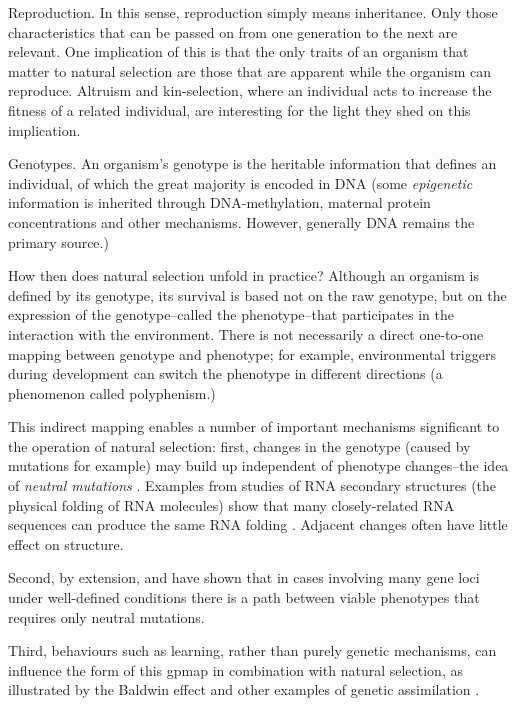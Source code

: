 Reproduction. In this sense, reproduction simply means inheritance. Only those characteristics that can be passed on from one generation to the next are relevant. One implication of this is that the only traits of an organism that matter to natural selection are those that are apparent while the organism can reproduce. Altruism and kin-selection, where an individual acts to increase the fitness of a related individual, are interesting for the light they shed on this implication.

Genotypes. An organism's \gls{genotype} is the heritable information that defines an individual, of which the great majority is encoded in DNA (some \emph{epigenetic} information is inherited through DNA-methylation, maternal protein concentrations and other mechanisms. However, generally DNA remains the primary source.)

How then does natural selection unfold in practice? Although an organism is defined by its genotype, its survival is based not on the raw genotype, but on the expression of the genotype--called the \gls{phenotype}--that participates in the interaction with the environment. There is not necessarily a direct one-to-one mapping between genotype and phenotype; for example, environmental triggers
during development can switch the phenotype in different directions (a phenomenon called \gls{polyphenism}.)

This indirect mapping enables a number of important mechanisms significant to the operation of natural selection: first, changes in the genotype (caused by mutations for example) may build up independent of phenotype changes--the idea of \emph{neutral mutations} \parencite{Ohta:1996vn,Ohta:2002ys,Ohta:1973kx}. Examples from studies of RNA secondary structures (the physical folding of RNA molecules) show that many closely-related RNA sequences can produce the same RNA folding \parencite{Fontana:1993zn}. Adjacent changes often have little effect on structure.

Second, by extension, \parencite{Gavrilets:1997qt} and \parencite{Gravner:2007yd} have shown that in cases involving many gene loci under well-defined conditions there is a path between viable phenotypes that requires only neutral mutations.

Third, behaviours such as learning, rather than purely genetic mechanisms, can influence the form of this \gls{gpmap} in combination with natural selection, as illustrated by the Baldwin effect \parencite{Baldwin:1896ly} and other examples of genetic assimilation \cite{Hinton:1987vy,Siegal:2002qn,Waddington:1942jb}.

